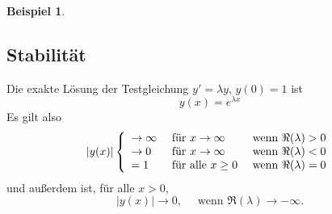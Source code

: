 \documentclass[
]{mycourse}
\theoremstyle{mythm}
\newtheorem{beispiel}[theorem]{Beispiel}
\theoremstyle{break}
\renewcommand{\im}{\ensuremath{\mathrm{i}}} 			      	%
\begin{document}
\begin{beispiel}
\begin{enumerate}[(a)]
\end{enumerate}
\end{beispiel}


\subsection{Stabilität}

Die exakte Lösung der Testgleichung $y'=\lambda y$, $y(0)=1$ ist 
\[
y(x)=e^{\lambda x}%
\]
Es gilt also
\[
|y(x)| \left\{ \begin{array}{l l l} \to \infty & \mbox{ für $x\to \infty$} & \mbox{ wenn } \Re(\lambda)>0 \\
\to 0 & \mbox{ für $x\to \infty$} & \mbox{ wenn } \Re(\lambda)<0 \\
=1 & \mbox{ für alle $x\geq 0$} & \mbox{ wenn } \Re(\lambda)=0
\end{array}\right.
\]
und außerdem ist, für alle $x>0$,
\[
|y(x)|\to 0, \quad \mbox{ wenn } \Re(\lambda)\to -\infty.
\]
\end{document}
